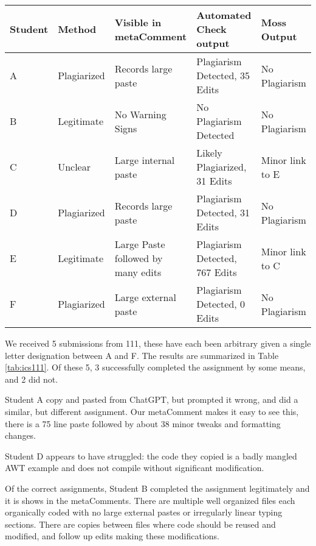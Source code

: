 \documentclass[letterpaper,10pt,conference]{IEEEtran}
\newcommand{\metaComment}{metaComment\xspace}
\begin{document}
\begin{table*}[thb]
    \centering
    \caption{ICS 111 Case study}
    \label{tab:ics111}
    \begin{tabular}{|l|l|l|l|l|}
        \hline
        Student & Method & Visible in \metaComment & Automated Check output & Moss Output \\
        \hline
        A & Plagiarized & Records large paste & Plagiarism Detected, 35 Edits & No Plagiarism \\\rowcolor{Gray}
        B & Legitimate & No Warning Signs & No Plagiarism Detected & No Plagiarism \\
        C & Unclear & Large internal paste & Likely Plagiarized, 31 Edits & Minor link to E \\\rowcolor{Gray}
        D & Plagiarized& Records large paste & Plagiarism Detected, 31 Edits & No Plagiarism \\
        E & Legitimate & Large Paste followed by many edits & Plagiarism Detected, 767 Edits & Minor link to C \\\rowcolor{Gray}
        F & Plagiarized & Large external paste & Plagiarism Detected, 0 Edits & No Plagiarism \\
        \hline
    \end{tabular}
\end{table*}


We received 5 submissions from 111, these have each been arbitrary given a single letter designation between A and F.  The results are summarized in Table \ref{tab:ics111}.  Of these 5, 3 successfully completed the assignment by some means, and 2 did not.

  Student A copy and pasted from ChatGPT, but prompted it wrong, and did a similar, but different assignment.  Our \metaComment makes it easy to see this, there is a 75 line paste followed by about 38 minor tweaks and formatting changes.

Student D appears to have struggled: the code they copied is a badly mangled AWT example and does not compile without significant modification.

Of the correct assignments, Student B completed the assignment legitimately and it is shows in the \metaComment{}s.  There are multiple well organized files each organically coded with no large external pastes or irregularly linear typing sections.  There are copies between files where code should be reused and modified, and follow up edits making these modifications.
\end{document}
